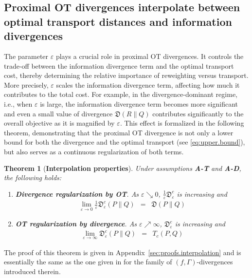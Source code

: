 \documentclass{amsart}
\newtheorem{theorem}{Theorem}[section]
\theoremstyle{definition}
\theoremstyle{remark}
\numberwithin{equation}{section}
\begin{document}
\subsection{Proximal OT divergences interpolate between optimal transport distances and information divergences}
\label{sec:interpolation}

The parameter $\varepsilon$ plays a crucial role in proximal OT divergences. It controls the trade-off between the information divergence term and the optimal transport cost, thereby determining the relative importance of reweighting versus transport. More precisely, $\varepsilon$ scales the information divergence term, affecting how much it contributes to the total cost. For example, in the divergence-dominant regime, i.e., when $\varepsilon$ is large, the information divergence term becomes more significant and even a small value of divergence $\mathfrak{D}(R\|Q)$ contributes significantly to the overall objective as it is magnified by $\varepsilon$. %
This effect is formalized in the following theorem, demonstrating that the proximal OT divergence is not only a lower bound for both the divergence and the optimal transport (see \eqref{eq:upper.bound}), but also serves as a continuous regularization of both terms.

\begin{theorem}[\bf Interpolation properties]\label{thm:interpolation}
Under assumptions {\bf A-T} and {\bf A-D}, the following holds:
\begin{enumerate}
 \item{\bf Divergence regularization by OT}.  As $\varepsilon \searrow 0$, $\frac{1}{\varepsilon} \mathfrak{D}^{c}_{\varepsilon}$ is increasing and 
\begin{eqnarray}
    \lim_{\varepsilon \to 0} \frac{1}{\varepsilon} \mathfrak{D}^{c}_{\varepsilon}(P\|Q)  &=& \mathfrak{D}(P\|Q)
\end{eqnarray}
 
\item{{\bf OT regularization by divergence}}. As $\varepsilon \nearrow \infty$, $\mathfrak{D}^{c}_{\varepsilon}$ is increasing and 
\begin{eqnarray}
    \lim_{\varepsilon \to \infty} \mathfrak{D}^{c}_{\varepsilon}(P\|Q) &=&  T_c(P,Q)
    \end{eqnarray}
\end{enumerate}
\end{theorem}

The proof of this theorem is given in Appendix~\ref{sec:proofs.interpolation} and is essentially the same as the one given in \cite{dupuis2022formulation,birrell2022f} for the family of $(f,\Gamma)$-divergences introduced therein.
\end{document}
